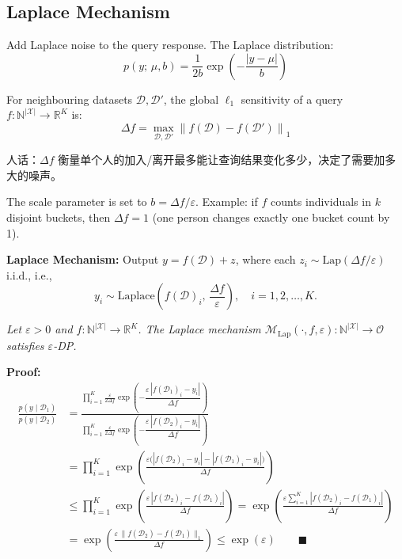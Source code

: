 \documentclass[UTF8]{ctexart}
\begin{document}
\subsection{Laplace Mechanism}

Add Laplace noise to the query response. The Laplace distribution:
\[
    p(y;\, \mu, b) = \frac{1}{2b} \exp\!\left(-\frac{|y - \mu|}{b}\right)
\]

\begin{mdframed}[linewidth=1.5pt, linecolor=blue!60, backgroundcolor=blue!5,
    frametitle={\textbf{Definition 3 (Global $\ell_1$ sensitivity)}},
    frametitlebackgroundcolor=blue!40, frametitlerule=true]
For neighbouring datasets $\mathcal{D}, \mathcal{D}'$, the global $\ell_1$ sensitivity of a query $f: \mathbb{N}^{|\mathcal{X}|} \to \mathbb{R}^K$ is:
\[
    \Delta f = \max_{\mathcal{D},\mathcal{D}'} \left\| f(\mathcal{D}) - f(\mathcal{D}') \right\|_1
\]
\end{mdframed}
人话：$\Delta f$ 衡量单个人的加入/离开最多能让查询结果变化多少，决定了需要加多大的噪声。

The scale parameter is set to $b = \Delta f / \varepsilon$. Example: if $f$ counts individuals in $k$ disjoint buckets, then $\Delta f = 1$ (one person changes exactly one bucket count by 1).

\textbf{Laplace Mechanism:} Output $y = f(\mathcal{D}) + z$, where each $z_i \sim \mathrm{Lap}(\Delta f/\varepsilon)$ i.i.d., i.e.,
\[
    y_i \sim \mathrm{Laplace}\!\left(f(\mathcal{D})_i,\, \frac{\Delta f}{\varepsilon}\right), \quad i = 1, 2, \ldots, K.
\]

\begin{mdframed}[linewidth=1.5pt, linecolor=blue!60, backgroundcolor=blue!5,
    frametitle={\textbf{Theorem 1 (DP guarantees for Laplace mechanism)}},
    frametitlebackgroundcolor=blue!40, frametitlerule=true]
\textit{Let $\varepsilon > 0$ and $f: \mathbb{N}^{|\mathcal{X}|} \to \mathbb{R}^K$. The Laplace mechanism $\mathcal{M}_{\mathrm{Lap}}(\cdot, f, \varepsilon): \mathbb{N}^{|\mathcal{X}|} \to \mathcal{O}$ satisfies $\varepsilon$-DP.}
\end{mdframed}

\textbf{Proof:}
\begin{align*}
\frac{p(y \mid \mathcal{D}_1)}{p(y \mid \mathcal{D}_2)}
&= \frac{\prod_{i=1}^{K} \frac{\varepsilon}{2\Delta f} \exp\!\left(-\dfrac{\varepsilon\,|f(\mathcal{D}_1)_i - y_i|}{\Delta f}\right)}
        {\prod_{i=1}^{K} \frac{\varepsilon}{2\Delta f} \exp\!\left(-\dfrac{\varepsilon\,|f(\mathcal{D}_2)_i - y_i|}{\Delta f}\right)} \\[6pt]
&= \prod_{i=1}^{K} \exp\!\left(\frac{\varepsilon\bigl(|f(\mathcal{D}_2)_i - y_i| - |f(\mathcal{D}_1)_i - y_i|\bigr)}{\Delta f}\right) \\[6pt]
&\leq \prod_{i=1}^{K} \exp\!\left(\frac{\varepsilon\,|f(\mathcal{D}_2)_i - f(\mathcal{D}_1)_i|}{\Delta f}\right)
 = \exp\!\left(\frac{\varepsilon \sum_{i=1}^{K}|f(\mathcal{D}_2)_i - f(\mathcal{D}_1)_i|}{\Delta f}\right) \\[6pt]
&= \exp\!\left(\frac{\varepsilon\,\|f(\mathcal{D}_2) - f(\mathcal{D}_1)\|_1}{\Delta f}\right)
 \leq \exp(\varepsilon) \qquad \blacksquare
\end{align*}
\end{document}
